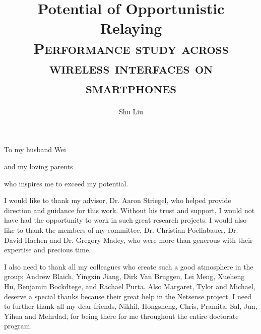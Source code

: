 \documentclass[final, numrefs, sort&compress, noinfo]{nddiss2e}
\begin{document}
\frontmatter

\title{Potential of Opportunistic Relaying\\ {\small\scshape Performance study across wireless interfaces on smartphones} }
\author{Shu Liu}

\maketitle
%
%

\makecopyright

\begin{abstract}
\end{abstract}

\begin{dedication}
  To my husband Wei
  
  and my loving parents
  
  who inspires me to exceed my potential.
   
\end{dedication}

\tableofcontents
\listoffigures
\listoftables

\begin{acknowledge}
I would like to thank my advisor, Dr. Aaron Striegel, who helped provide
direction and guidance for this work. Without his trust and support, I would not have had the opportunity to work in such great research projects. I would also like to thank the members of my committee, Dr. Christian Poellabauer, Dr. David Hachen and Dr. Gregory Madey, who were more than generous with their expertise and precious time.

I also need to thank all my colleagues who create such a good atmosphere in the group;
Andrew Blaich, Yingxin Jiang, Dirk Van Bruggen, Lei Meng, Xueheng Hu, Benjamin Bockdtege, and Rachael Purta.  Also Margaret, Tylor and Michael, deserve a special thanks because their great help in the Netsense project. I need to further thank all my dear friends, Nikhil, Hongsheng, Chris, Pramita, Sal, Jun, Yihua and Mehrdad, for being there for me throughout the entire doctorate program. 
\end{acknowledge}
\end{document}
